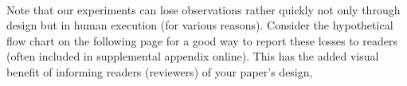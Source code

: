 \documentclass[12pt]{article}\usepackage[]{graphicx}\usepackage[]{color}
\begin{document}
\begin{flushleft}



\hfill \\



%
Note that our experiments can lose observations rather quickly not only through design but in human execution (for various reasons). Consider the hypothetical flow chart on the following page for a good way to report these losses to readers (often included in supplemental appendix online). This has the added visual benefit of informing readers (reviewers) of your paper's design,



\end{flushleft}
\end{document}
